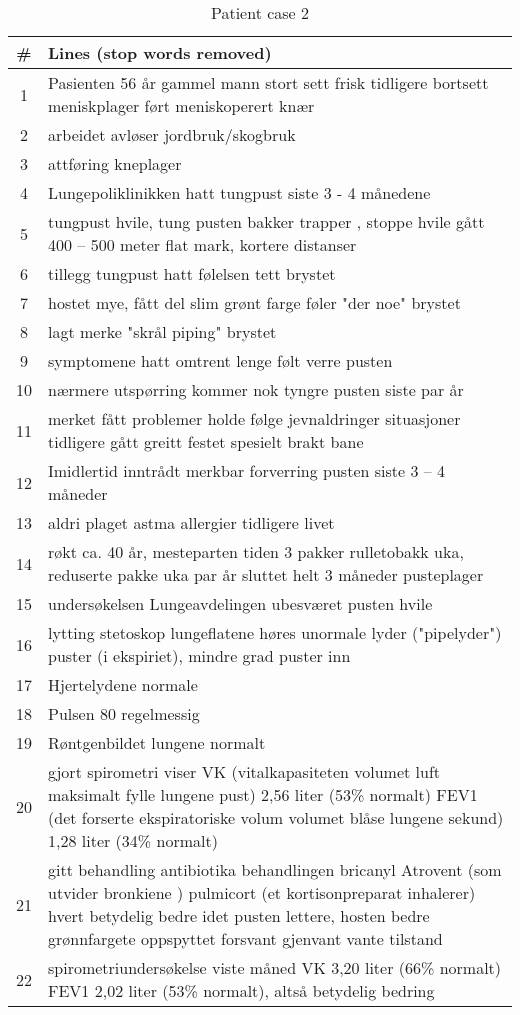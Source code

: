 \begin{table}[htbp] \footnotesize \center
\caption{Patient case 2\label{tab:pcase2}}
\begin{tabularx}{\textwidth}{c X}
    \toprule
    \# & Lines (stop words removed) \\
    \midrule
	1 & Pasienten 56 år gammel mann stort sett frisk tidligere bortsett meniskplager ført meniskoperert knær \\
	2 & arbeidet avløser jordbruk/skogbruk \\
	3 & attføring kneplager \\
	4 & Lungepoliklinikken hatt tungpust siste 3 - 4 månedene \\
	5 & tungpust hvile, tung pusten bakker trapper , stoppe hvile gått 400 -- 500 meter flat mark, kortere distanser \\
	6 & tillegg tungpust hatt følelsen tett brystet \\
	7 & hostet mye, fått del slim grønt farge føler "der noe" brystet \\
	8 & lagt merke "skrål piping" brystet \\
	9 & symptomene hatt omtrent lenge følt verre pusten \\
	10 & nærmere utspørring kommer nok tyngre pusten siste par år \\
	11 & merket fått problemer holde følge jevnaldringer situasjoner tidligere gått greitt festet spesielt brakt bane \\
	12 & Imidlertid inntrådt merkbar forverring pusten siste 3 -- 4 måneder \\
	13 & aldri plaget astma allergier tidligere livet \\
	14 & røkt ca. 40 år, mesteparten tiden 3 pakker rulletobakk uka, reduserte pakke uka par år sluttet helt 3 måneder pusteplager \\
	15 & undersøkelsen Lungeavdelingen ubesværet pusten hvile \\
	16 & lytting stetoskop lungeflatene høres unormale lyder ("pipelyder") puster (i ekspiriet), mindre grad puster inn \\
	17 & Hjertelydene normale \\
	18 & Pulsen 80 regelmessig \\
	19 & Røntgenbildet lungene normalt \\
	20 & gjort spirometri viser VK (vitalkapasiteten volumet luft maksimalt fylle lungene pust) 2,56 liter (53\% normalt) FEV1 (det forserte ekspiratoriske volum volumet blåse lungene sekund) 1,28 liter (34\% normalt) \\
	21 & gitt behandling antibiotika behandlingen bricanyl Atrovent (som utvider bronkiene ) pulmicort (et kortisonpreparat inhalerer) hvert betydelig bedre idet pusten lettere, hosten bedre grønnfargete oppspyttet forsvant gjenvant vante tilstand \\
	22 & spirometriundersøkelse viste måned VK 3,20 liter (66\% normalt) FEV1 2,02 liter (53\% normalt), altså betydelig bedring \\
	\bottomrule
\end{tabularx}
\end{table}


